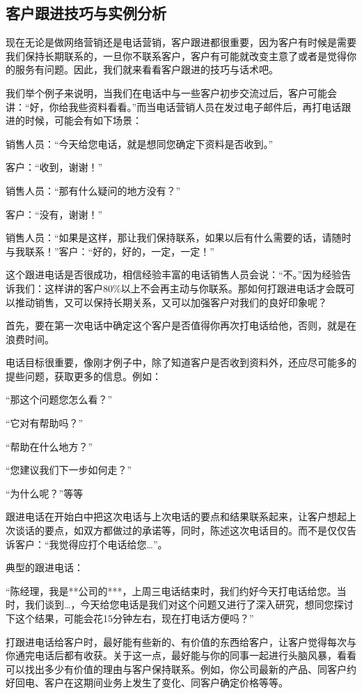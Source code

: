 \subsection {客户跟进技巧与实例分析}

    现在无论是做网络营销还是电话营销，客户跟进都很重要，因为客户有时候是需要我们保持长期联系的，一旦你不联系客户，客户有可能就改变主意了或者是觉得你的服务有问题。因此，我们就来看看客户跟进的技巧与话术吧。

    我们举个例子来说明，当我们在电话中与一些客户初步交流过后，客户可能会讲：“好，你给我些资料看看。”而当电话营销人员在发过电子邮件后，再打电话跟进的时候，可能会有如下场景：

    销售人员：“今天给您电话，就是想同您确定下资料是否收到。”

    客户：“收到，谢谢！”

    销售人员：“那有什么疑问的地方没有？”

    客户：“没有，谢谢！”

    销售人员：“如果是这样，那让我们保持联系，如果以后有什么需要的话，请随时与我联系！”客户：“好的，好的，一定，一定！”

    这个跟进电话是否很成功，相信经验丰富的电话销售人员会说：“不。”因为经验告诉我们：这样讲的客户80\%以上不会再主动与你联系。那如何打跟进电话才会既可以推动销售，又可以保持长期关系，又可以加强客户对我们的良好印象呢？

    首先，要在第一次电话中确定这个客户是否值得你再次打电话给他，否则，就是在浪费时间。

    电话目标很重要，像刚才例子中，除了知道客户是否收到资料外，还应尽可能多的提些问题，获取更多的信息。例如：

    “那这个问题您怎么看？”

    “它对有帮助吗？”

    “帮助在什么地方？”

    “您建议我们下一步如何走？”

    “为什么呢？”等等

    跟进电话在开始白中把这次电话与上次电话的要点和结果联系起来，让客户想起上次谈话的要点，如双方都做过的承诺等，同时，陈述这次电话目的。而不是仅仅告诉客户：“我觉得应打个电话给您…”。

    典型的跟进电话：

    “陈经理，我是**公司的***，上周三电话结束时，我们约好今天打电话给您。当时，我们谈到…，今天给您电话是我们对这个问题又进行了深入研究，想同您探讨下这个结果，可能会花15分钟左右，现在打电话方便吗？”

    打跟进电话给客户时，最好能有些新的、有价值的东西给客户，让客户觉得每次与你通完电话后都有收获。关于这一点，最好能与你的同事一起进行头脑风暴，看看可以找出多少有价值的理由与客户保持联系。例如，你公司最新的产品、同客户约好回电、客户在这期间业务上发生了变化、同客户确定价格等等。

